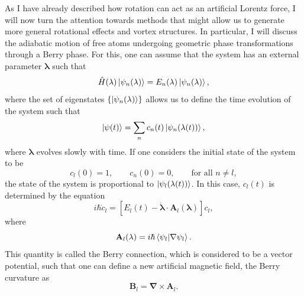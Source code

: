 As I have already described how rotation can act as an artificial Lorentz force, I will now turn the attention towards methods that might allow us to generate more general rotational effects and vortex structures.
In particular, I will discuss the adiabatic motion of free atoms undergoing geometric phase transformations through a Berry phase. 
For this, one can assume that the system has an external parameter $\mathbf{\lambda}$ such that
\begin{equation}
\hat H(\mathbf{\lambda}) \ket{\psi_n(\mathbf{\lambda})} = E_n(\mathbf{\lambda})\ket{\psi_n(\mathbf{\lambda})},
\end{equation}
where the set of eigenstates $\left\{ \ket{\psi_n(\mathbf{\lambda})} \right\}$ allows us to define the time evolution of the system such that
\begin{equation}
\ket{\psi(t)} = \sum_n c_n(t) \ket{\psi_n(\mathbf{\lambda}(t))},
\end{equation}
where $\mathbf{\lambda}$ evolves slowly with time. If one considers the initial state of the system to be
\begin{equation}
c_l(0) = 1,
\qquad
c_n(0) = 0, 
\qquad
\text{for all } n\neq l,
\end{equation}
the state of the system is proportional to $\ket{\psi_l(\mathbf{\lambda}(t))}$.
In this case, $c_l(t)$ is determined by the equation
\begin{equation}
i \hbar \dot{c}_l =  [E_l(t) - \dot{\mathbf{\lambda}} \cdot \mathbf{A}_l(\mathbf{\lambda})]c_l,
\label{Bcnx-1}
\end{equation}
where 
\begin{equation}
\mathbf{A}_l(\mathbf{\lambda}) = i \hbar \braket{\psi_l|\nabla\psi_l}.
\label{eqn:Bcnx}
\end{equation}
This quantity is called the Berry connection, which is considered to be a vector potential, such that one can define a new artificial magnetic field, the Berry curvature as
\begin{equation}
\mathbf{B}_l = \mathbf{\nabla} \times \mathbf{A}_l.
\label{eqn:BC}
\end{equation}

